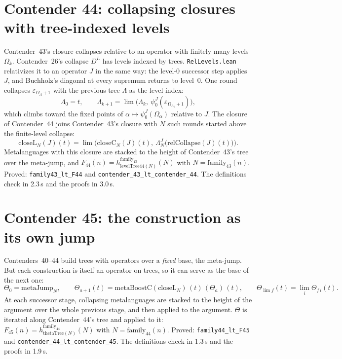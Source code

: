 \documentclass[11pt]{article}
\theoremstyle{definition}
\theoremstyle{remark}
\newcommand{\lean}[1]{\texttt{#1}}
\begin{document}
\section{Contender 44: collapsing closures with tree-indexed levels}

Contender~43's closure collapses relative to an operator with finitely many
levels $\Omega_k$. Contender~26's collapse $D^L$ has levels indexed by trees.
\lean{RelLevels.lean} relativizes it to an operator $J$ in the same way: the
level-0 successor step applies $J$, and Buchholz's diagonal at every supremum
returns to level~0. One round collapses $\varepsilon_{\Omega_\Lambda+1}$ with
the previous tree $\Lambda$ as the level index:
\[
\Lambda_0=t,\qquad \Lambda_{k+1}=\lim\bigl(\Lambda_k,\ \psi^J_0(\varepsilon_{\Omega_{\Lambda_k}+1})\bigr),
\]
which climbs toward the fixed points of $\alpha\mapsto\psi^J_0(\Omega_\alpha)$
relative to $J$. The closure of Contender~44 joins Contender~43's closure with
$N$ such rounds started above the finite-level collapse:
\[
\mathrm{closeL}_N(J)(t)=\lim\bigl(\mathrm{closeC}_N(J)(t),\
\Lambda^{J}_N\bigl(\mathrm{relCollapse}(J)(t)\bigr)\bigr).
\]
Metalanguages with this closure are stacked to the height of Contender~43's tree
over the meta-jump, and
$F_{44}(n)=h^{\mathrm{family}_{43}}_{\mathrm{levelTree44}(N)}(N)$ with
$N=\mathrm{family}_{43}(n)$. Proved: \lean{family43\_lt\_F44} and
\lean{contender\_43\_lt\_\allowbreak contender\_44}. The definitions check in
2.3\,s and the proofs in 3.0\,s.

\section{Contender 45: the construction as its own jump}

Contenders~40--44 build trees with operators over a \emph{fixed} base, the
meta-jump. But each construction is itself an operator on trees, so it can
serve as the base of the next one:
\[
\Theta_0=\mathrm{metaJump}_N,\qquad
\Theta_{a+1}(t)=\mathrm{metaBoostC}(\mathrm{closeL}_N)\,(t)\,(\Theta_a)\,(t),\qquad
\Theta_{\lim f}(t)=\lim_i\Theta_{f\,i}(t).
\]
At each successor stage, collapsing metalanguages are stacked to the height of
the argument over the whole previous stage, and then applied to the argument.
$\Theta$ is iterated along Contender~44's tree and applied to it:
$F_{45}(n)=h^{\mathrm{family}_{44}}_{\mathrm{thetaTree}(N)}(N)$ with
$N=\mathrm{family}_{44}(n)$. Proved: \lean{family44\_lt\_F45} and
\lean{contender\_44\_lt\_\allowbreak contender\_45}. The definitions check in
1.3\,s and the proofs in 1.9\,s.
\end{document}
